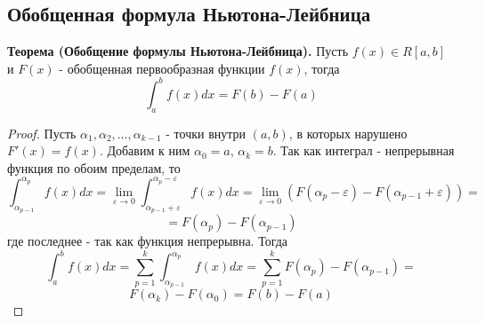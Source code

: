 \documentclass{article}
\newcommand*{\limToZero}[2]{\displaystyle \lim_{#1 \to 0} #2}
\newcommand*{\theorem}[2]{\textbf{Теорема #1. } #2 \newline}
\newcommand*{\eps}{\varepsilon}
\begin{document}
\subsection{Обобщенная формула Ньютона-Лейбница}
\theorem{(Обобщение формулы Ньютона-Лейбница)}{Пусть $f(x) \in R[a, b]$ и $F(x)$ - обобщенная первообразная функции $f(x)$, тогда}
$$
    \int_{a}^{b}f(x)dx = F(b) - F(a)
$$ 
\begin{proof}
    Пусть $\alpha_1, \alpha_2, \dots, \alpha_{k-1}$ - точки внутри $(a, b)$, в которых нарушено $F'(x) = f(x)$. Добавим к ним $\alpha_0 = a$, $\alpha_k = b$. Так как интеграл - непрерывная функция по обоим пределам, то
    $$
        \int_{\alpha_{p - 1}}^{\alpha_p} f(x)dx = \limToZero{\eps}{\int_{\alpha_{p-1} + \eps}^{\alpha_p - \eps} f(x)dx} = \limToZero{\eps}{(F(\alpha_p - \eps) - F(\alpha_{p - 1} + \eps))} = 
    $$
    $$
        = F(\alpha_p) - F(\alpha_{p - 1})
    $$
    где последнее - так как функция непрерывна. Тогда 
    $$
        \int_{a}^{b} f(x)dx = \sum_{p = 1}^{k} \int_{\alpha_{p-1}}^{\alpha_p}f(x)dx = \sum_{p = 1}^{k} F(\alpha_p) - F(\alpha_{p - 1}) = 
    $$
    $$
        F(\alpha_k) - F(\alpha_0) = F(b) - F(a)
    $$
\end{proof}
\end{document}
